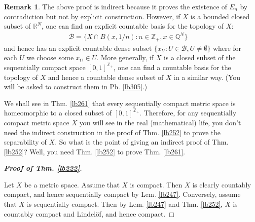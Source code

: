 \documentclass[12pt,b5paper,notitlepage]{article}
\theoremstyle{definition}
\newtheorem{rem}[df]{Remark}
\theoremstyle{plain}
\newcommand{\mc}{\mathcal}
\newcommand{\Zbb}{\mathbb Z}
\newcommand{\Qbb}{\mathbb Q}
\newcommand{\Rbb}{\mathbb R}
\numberwithin{equation}{section}
\begin{document}
\begin{rem}\label{lb483}
The above proof is indirect because it proves the existence of $E_n$ by contradiction but not by explicit construction. However, if $X$ is a bounded closed subset of $\Rbb^N$, one can find an explicit countable basis for the topology of $X$:
\begin{align*}
\mc B=\{X\cap B(x,1/n):n\in\Zbb_+,x\in\Qbb^N\}
\end{align*}
and hence has an explicit countable dense subset $\{x_U:U\in\mc B,U\neq\emptyset\}$ where for each $U$ we choose some $x_U\in U$. More generally, if $X$ is a closed subset of the sequentially compact space $[0,1]^{\Zbb_+}$, one can find a countable basis for the topology of $X$ and hence a countable dense subset of $X$ in a similar way. (You will be asked to construct them in Pb. \ref{lb305}.) 


We shall see in Thm. \ref{lb261} that every sequentially compact metric space is homeomorphic to a closed subset of $[0,1]^{\Zbb_+}$. Therefore, for any sequentially compact metric space $X$ you will see in the real (mathematical) life, you don't need the indirect construction in the proof of Thm. \ref{lb252} to prove the separability of $X$. So what is the point of giving an indirect proof of Thm. \ref{lb252}? Well, you need Thm. \ref{lb252} to prove Thm. \ref{lb261}.  \hfill\qedsymbol
\end{rem}





\begin{proof}[\textbf{Proof of Thm. \ref{lb222}}] \hypertarget{target1}{}
Let $X$ be a metric space. Assume that $X$ is compact. Then $X$ is clearly countably compact, and hence sequentially compact by Lem. \ref{lb247}. Conversely, assume that $X$ is sequentially compact. Then by Lem. \ref{lb247} and Thm. \ref{lb252}, $X$ is countably compact and Lindel\"of, and hence compact.
\end{proof}
\end{document}
